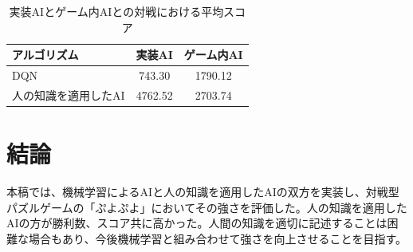 \documentclass[twocolumn, a4paper]{UECIEresume}
\begin{document}
\begin{table}[tbp]
\begin{center}
\caption{実装AIとゲーム内AIとの対戦における平均スコア} \label{tab:score}
  \begin{tabular}{|l|c|c|} \hline
アルゴリズム & 実装AI & ゲーム内AI\\ \hline
DQN & 743.30 & 1790.12\\ \hline
人の知識を適用したAI & 4762.52 & 2703.74\\ \hline
\end{tabular}
\end{center}
\end{table}


\section{結論}
本稿では、機械学習によるAIと人の知識を適用したAIの双方を実装し、対戦型パズルゲームの「ぷよぷよ」においてその強さを評価した。人の知識を適用したAIの方が勝利数、スコア共に高かった。人間の知識を適切に記述することは困難な場合もあり、今後機械学習と組み合わせて強さを向上させることを目指す。



{\small


}
\end{document}
